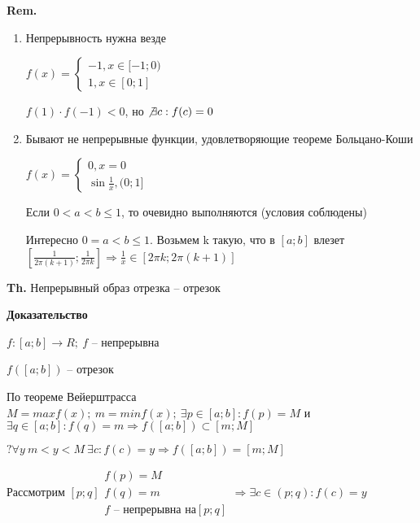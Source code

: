 \documentclass[14pt, letter paper]{article}
\begin{document}
\vspace{5mm}

\textbf{Rem.} 

\begin{enumerate}
    \item Непрерывность нужна везде

    $f(x) = \begin{cases}
        -1, x \in [-1; 0) \\
        1, x \in [0; 1]
    \end{cases}$

    $f(1) \cdot f(-1) < 0$, но $\not\exists c : f(c) = 0$

    \item Бывают не непрерывные функции, удовлетворяющие теореме Больцано-Коши

    $f(x) = \begin{cases}
        0, x = 0 \\
        \sin{\frac{1}{x}}, (0; 1]
    \end{cases}$

    Если $0 < a < b \leq 1$, то очевидно выполняются (условия соблюдены)

    Интересно $0 = a < b \leq 1$. Возьмем k такую, что в $[a;b]$ влезет $[\frac{1}{2\pi(k+1)};\frac{1}{2\pi k}] \Rightarrow \frac{1}{x} \in [2\pi k; 2\pi (k + 1)]$
\end{enumerate}

\vspace{5mm}

\textbf{Th.} Непрерывный образ отрезка -- отрезок

\begin{center}
    \textbf{Доказательство}
\end{center}

$f : [a;b] \rightarrow R;\ f$ -- непрерывна

$f([a;b])$ -- отрезок

По теореме Вейерштрасса $M = max f(x);\ m = min f(x);\ \exists p \in [a;b] : f(p) = M$ и $\exists q \in [a;b] : f(q) = m \Rightarrow f([a;b]) \subset [m;M]$

$? \forall y\ m < y < M\ \exists c : f(c) = y \Rightarrow f([a;b]) = [m; M]$

Рассмотрим $[p;q] \begin{gathered}
    f(p) = M \\
    f(q) = m \\
    f \text{ -- непрерывна на} [p;q]
\end{gathered} \Rightarrow \exists c \in (p; q) : f(c) = y$
\end{document}
